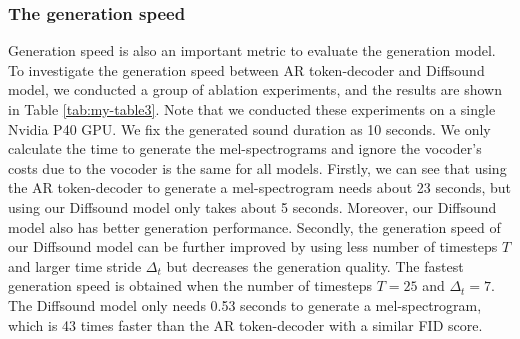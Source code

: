 \documentclass[lettersize,journal]{IEEEtran}
\begin{document}
\subsubsection{The generation speed}
Generation speed is also an important metric to evaluate the generation model. To investigate the generation speed between AR token-decoder and Diffsound model, we conducted a group of ablation experiments, and the results are shown in Table \ref{tab:my-table3}. Note that we conducted these experiments on a single Nvidia P40 GPU. We fix the generated sound duration as 10 seconds. {\color{black}We only calculate the time to generate the mel-spectrograms and ignore the vocoder's costs due to the vocoder is the same for all models.} Firstly, we can see that using the AR token-decoder to generate a mel-spectrogram needs about 23 seconds, but using our Diffsound model only takes about 5 seconds. Moreover, our Diffsound model also has better generation performance. Secondly, the generation speed of our Diffsound model can be further improved by using less number of timesteps $T$ and larger time stride $\Delta_t$ but decreases the generation quality. The fastest generation speed is obtained when the number of timesteps $T=25$ and $\Delta_t=7$. The Diffsound model only needs 0.53 seconds to generate a mel-spectrogram, which is 43 times faster than the AR token-decoder with a similar FID score. 
\end{document}

